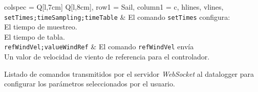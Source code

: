 \begin{table}[H]
\begin{tblr}{
    colspec = {Q[l,7cm] Q[l,8cm]},
    row{1} = {Sail},
    column{1} = {c},
    hlines,
    vlines,
}
\texttt{setTimes;timeSampling;timeTable}                    & {El comando \texttt{setTimes} configura:\\\hspace{\dimexpr\labelsep+0.5\tabcolsep}El tiempo de muestreo.\\\hspace{\dimexpr\labelsep+0.5\tabcolsep}El tiempo de tabla.}                                                                                                                                                                                                         \\
\texttt{refWindVel;valueWindRef}                    & {El comando \texttt{refWindVel} envía\\\hspace{\dimexpr\labelsep+0.5\tabcolsep}Un valor de velocidad de viento de referencia para el controlador.}                                                                                                                                                                                                                                      
\end{tblr}
\caption{Listado de comandos transmitidos por el servidor \textit{WebSocket} al datalogger para configurar los parámetros seleccionados por el usuario.}
\label{tab:comandoDataloggerWeb}
\end{table}
